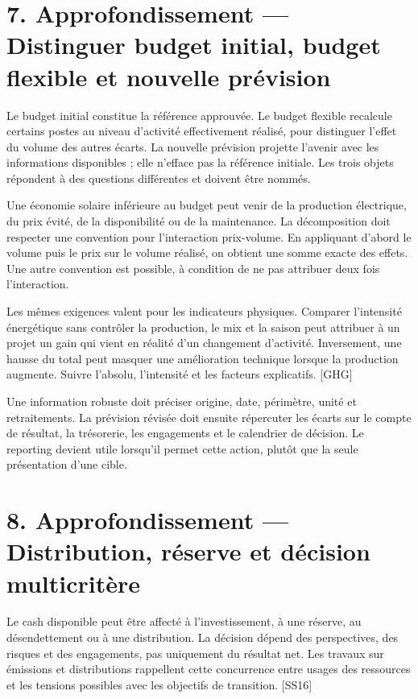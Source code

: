 \documentclass[12pt,a4paper]{article}
\begin{document}
\section*{7. Approfondissement --- Distinguer budget initial, budget flexible et nouvelle prévision}
Le budget initial constitue la référence approuvée. Le budget flexible recalcule certains postes au niveau d’activité effectivement réalisé, pour distinguer l’effet du volume des autres écarts. La nouvelle prévision projette l’avenir avec les informations disponibles ; elle n’efface pas la référence initiale. Les trois objets répondent à des questions différentes et doivent être nommés.


Une économie solaire inférieure au budget peut venir de la production électrique, du prix évité, de la disponibilité ou de la maintenance. La décomposition doit respecter une convention pour l’interaction prix-volume. En appliquant d’abord le volume puis le prix sur le volume réalisé, on obtient une somme exacte des effets. Une autre convention est possible, à condition de ne pas attribuer deux fois l’interaction.


Les mêmes exigences valent pour les indicateurs physiques. Comparer l’intensité énergétique sans contrôler la production, le mix et la saison peut attribuer à un projet un gain qui vient en réalité d’un changement d’activité. Inversement, une hausse du total peut masquer une amélioration technique lorsque la production augmente. Suivre l’absolu, l’intensité et les facteurs explicatifs. [GHG]


Une information robuste doit préciser origine, date, périmètre, unité et retraitements. La prévision révisée doit ensuite répercuter les écarts sur le compte de résultat, la trésorerie, les engagements et le calendrier de décision. Le reporting devient utile lorsqu’il permet cette action, plutôt que la seule présentation d’une cible.

\section*{8. Approfondissement --- Distribution, réserve et décision multicritère}
Le cash disponible peut être affecté à l’investissement, à une réserve, au désendettement ou à une distribution. La décision dépend des perspectives, des risques et des engagements, pas uniquement du résultat net. Les travaux sur émissions et distributions rappellent cette concurrence entre usages des ressources et les tensions possibles avec les objectifs de transition. [SS16]
\end{document}
